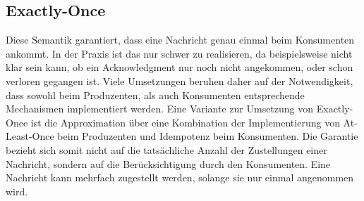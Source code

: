 \subsection*{Exactly-Once}
\label{subsec:exactlyOnce}
Diese Semantik garantiert, dass eine Nachricht genau einmal beim Konsumenten ankommt.
In der Praxis ist das nur schwer zu realisieren, da beispielsweise nicht klar sein kann, ob ein Acknowledgment nur noch nicht
angekommen, oder schon verloren gegangen ist.
Viele Umsetzungen beruhen daher auf der Notwendigkeit, dass sowohl beim Produzenten, als auch Konsumenten entsprechende Mechanismen
implementiert werden.
Eine Variante zur Umsetzung von Exactly-Once ist die Approximation über eine Kombination der Implementierung von At-Least-Once
beim Produzenten und Idempotenz beim Konsumenten.
Die Garantie bezieht sich somit nicht auf die tatsächliche Anzahl der Zustellungen einer Nachricht, sondern auf die Berücksichtigung
durch den Konsumenten.
Eine Nachricht kann mehrfach zugestellt werden, solange sie nur einmal angenommen wird.

